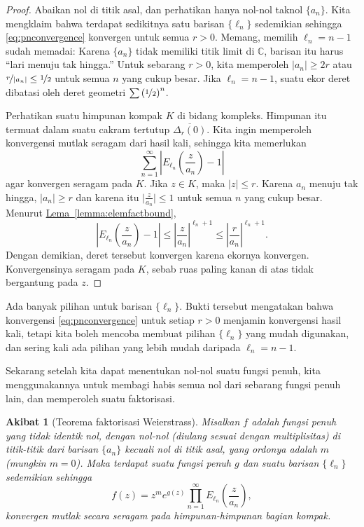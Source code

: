 \documentclass[12pt,openany]{book}
\newcommand{\sabs}[1]{\lvert {#1} \rvert}
\newcommand{\babs}[1]{\bigl\lvert {#1} \bigr\rvert}
\newcommand{\abs}[1]{\left\lvert {#1} \right\rvert}
\newcommand{\C}{{\mathbb{C}}}
\newcommand{\myquote}[1]{``#1''}
\theoremstyle{plain}
\newtheorem{cor}[thm]{Akibat}
\theoremstyle{remark}
\theoremstyle{definition}
\theoremstyle{exercise}
\theoremstyle{example}
\newcommand{\lemmaref}[1]{\hyperref[#1]{Lema~\ref*{#1}}}
\begin{document}
\begin{proof}
Abaikan nol di titik asal, dan perhatikan hanya
nol-nol taknol $\{ a_n \}$.  Kita mengklaim bahwa terdapat sedikitnya satu barisan $\{ \ell_n \}$
sedemikian sehingga \eqref{eq:pnconvergence} konvergen untuk semua $r > 0$.
Memang, memilih $\ell_n = n-1$ sudah memadai:
Karena $\{ a_n \}$ tidak memiliki titik limit di $\C$, barisan itu harus
\myquote{lari menuju tak hingga.}
Untuk sebarang $r > 0$, kita memperoleh $\sabs{a_n} \geq 2r$ atau
$\nicefrac{r}{\abs{a_n}} \leq \nicefrac{1}{2}$
untuk semua $n$ yang cukup besar.
Jika $\ell_n = n-1$, suatu ekor deret dibatasi
oleh deret geometri $\sum {(\nicefrac{1}{2})}^n$.

Perhatikan suatu himpunan kompak $K$ di bidang kompleks.  Himpunan itu termuat dalam suatu cakram tertutup
$\overline{\Delta_r(0)}$.  Kita ingin memperoleh konvergensi mutlak seragam
dari hasil kali, sehingga kita memerlukan
\begin{equation*}
\sum_{n=1}^\infty \abs{ E_{\ell_n}\left(\frac{z}{a_n}\right)-1}
\end{equation*}
agar konvergen seragam pada $K$.
Jika $z \in K$, maka $\sabs{z}\leq r$.  Karena $a_n$ menuju
tak hingga,
$\sabs{a_n} \geq r$
dan karena itu $\babs{\frac{z}{a_n}} \leq 1$
untuk semua $n$ yang cukup besar.
Menurut \lemmaref{lemma:elemfactbound},
\begin{equation*}
\abs{ E_{\ell_n}\left(\frac{z}{a_n}\right)-1}
\leq
\abs{\frac{z}{a_n}}^{\ell_n+1}
\leq
\abs{\frac{r}{a_n}}^{\ell_n+1} .
\end{equation*}
Dengan demikian, deret tersebut konvergen karena ekornya konvergen.  Konvergensinya
seragam pada $K$, sebab ruas paling kanan di atas tidak bergantung pada $z$.
\end{proof}

Ada banyak pilihan untuk barisan $\{ \ell_n \}$.  Bukti tersebut mengatakan
bahwa konvergensi \eqref{eq:pnconvergence} 
untuk setiap $r>0$ menjamin konvergensi hasil kali, tetapi kita boleh mencoba
membuat pilihan $\{ \ell_n \}$ yang mudah digunakan, dan sering kali
ada pilihan yang lebih mudah daripada $\ell_n=n-1$.

Sekarang setelah kita dapat menentukan nol-nol suatu fungsi penuh, kita
menggunakannya untuk membagi habis semua nol dari sebarang fungsi penuh lain, dan
memperoleh suatu faktorisasi.

\begin{cor}[Teorema faktorisasi Weierstrass]
Misalkan $f$ adalah fungsi penuh yang tidak identik nol,
dengan nol-nol (diulang sesuai dengan multiplisitas) di titik-titik dari
barisan $\{ a_n \}$ kecuali nol di
titik asal, yang ordonya adalah $m$ (mungkin $m=0$).  Maka terdapat suatu
fungsi penuh $g$ dan suatu barisan $\{ \ell_n \}$ sedemikian sehingga
\begin{equation*}
f(z) = z^m e^{g(z)} \prod_{n=1}^\infty E_{\ell_n}\left(\frac{z}{a_n}\right) ,
\end{equation*}
konvergen mutlak secara seragam pada himpunan-himpunan bagian kompak.
\end{cor}
\end{document}
